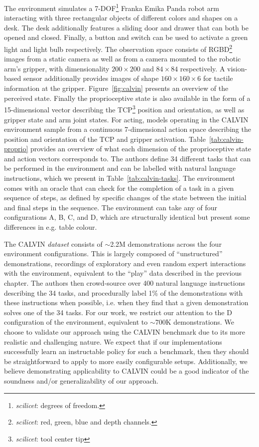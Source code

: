\documentclass[../main.tex]{subfiles}
\begin{document}
The environment simulates a 7-DOF\footnote{\textit{scilicet}: degrees of freedom.} Franka Emika
Panda robot arm~\citep{haddadin_franka_2022} interacting with three rectangular objects of different
colors and shapes on a desk. The desk additionally features a sliding door and drawer that can both
be opened and closed. Finally, a button and switch can be used to activate a green light and light
bulb respectively. The observation space consists of RGBD\footnote{\textit{scilicet}: red, green,
	blue and depth channels.} images from a static camera as well as from a camera mounted to the
robotic arm's gripper, with dimensionality $200 \times 200$ and $84 \times 84$ respectively.
A vision-based sensor additionally provides images of shape $160 \times 160 \times 6$ for tactile
information at the gripper. Figure~\ref{fig:calvin} presents an overview of the perceived state.
Finally the proprioceptive state is also available in the form of a 15-dimensional vector describing
the TCP\footnote{\textit{scilicet}: tool center tip} position and orientation, as well as gripper
state and arm joint states.  For acting, models operating in the CALVIN environment sample from
a continuous 7-dimensional action space describing the position and orientation of the TCP and
gripper activation. Table~\ref{tab:calvin-proprio} provides an overview of what each dimension of
the proprioceptive state and action vectors corresponds to. The authors define 34 different tasks
that can be performed in the environment and can be labelled with natural language instructions,
which we present in Table~\ref{tab:calvin-tasks}. The environment comes with an oracle that can
check for the completion of a task in a given sequence of steps, as defined by specific changes of
the state between the initial and final steps in the sequence. The environment can take any of four
configurations A, B, C, and D, which are structurally identical but present some differences in e.g.
table colour.

The CALVIN \emph{dataset} consists of $\sim$2.2M demonstrations across the four environment
configurations. This is largely composed of ``unstructured'' demonstrations, recordings of
exploratory and even random expert interactions with the environment, equivalent to the ``play''
data described in the previous chapter. The authors then crowd-source over 400 natural language
instructions describing the 34 tasks, and procedurally label 1\% of the demonstrations with these
instructions when possible, i.e. when they find that a given demonstration solves one of the 34
tasks. For our work, we restrict our attention to the D configuration of the environment, equivalent
to $\sim$700K demonstrations. We choose to validate our approach using the CALVIN benchmark due to
its more realistic and challenging nature. We expect that if our implementations successfully learn
an instructable policy for such a benchmark, then they should be straightforward to apply to more
easily configurable setups. Additionally, we believe demonstrating applicability to CALVIN could be
a good indicator of the soundness and/or generalizability of our approach.
\end{document}
